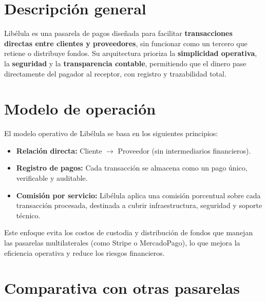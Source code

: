 \section{Descripción general}
    \noindent
		Libélula es una pasarela de pagos diseñada para facilitar \textbf{transacciones directas entre clientes y proveedores}, sin 
		funcionar como un tercero que retiene o distribuye fondos. Su arquitectura prioriza la \textbf{simplicidad operativa}, 
		la \textbf{seguridad} y la \textbf{transparencia contable}, permitiendo que el dinero pase directamente del pagador al 
		receptor, con registro y trazabilidad total.\par
    
\section{Modelo de operación}
    \noindent
		El modelo operativo de Libélula se basa en los siguientes principios:
		\begin{itemize}
			\item \textbf{Relación directa:} Cliente $\rightarrow$ Proveedor (sin intermediarios financieros).
			\item \textbf{Registro de pagos:} Cada transacción se almacena como un pago único, verificable y auditable.
			\item \textbf{Comisión por servicio:} Libélula aplica una comisión porcentual sobre cada transacción procesada, destinada a cubrir infraestructura, seguridad y soporte técnico.
		\end{itemize}    
    Este enfoque evita los costos de custodia y distribución de fondos que manejan las pasarelas multilaterales (como Stripe 
	o MercadoPago), lo que mejora la eficiencia operativa y reduce los riesgos financieros.\par

\section{Comparativa con otras pasarelas}
    
